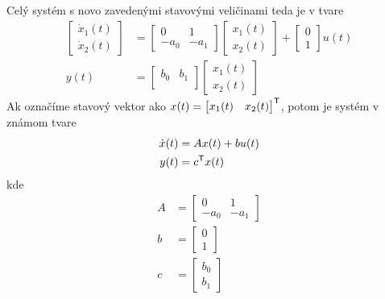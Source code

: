 \documentclass[a4paper, 10pt, ]{article}
\begin{document}
Celý systém s novo zavedenými stavovými veličinami teda je v tvare
\begin{align}
	\begin{bmatrix}
    	  \dot x_1(t) \\
		  \dot x_2(t)
 	\end{bmatrix}
	&=
	\begin{bmatrix}
    	0 & 1 \\
    	- a_0 & - a_1
  	\end{bmatrix}
    \begin{bmatrix}
    	  x_1(t) \\
		  x_2(t)
 	\end{bmatrix}
    +
    \begin{bmatrix}
    	  0 \\
		  1
 	\end{bmatrix}
    u(t)
    \\
    y(t)
    &=
    \begin{bmatrix}
        b_0 & b_1 \\
    \end{bmatrix}
    \begin{bmatrix}
          x_1(t) \\
          x_2(t)
    \end{bmatrix}
\end{align}
Ak označíme stavový vektor ako $x(t) = \begin{bmatrix} x_1(t) & x_2(t) \end{bmatrix}^{\mathsf{T}}$, potom je systém v známom tvare
\begin{subequations} \label{susDifRovnicPreODE}
    \begin{align}
    	\dot x(t) &= A x(t) + b u(t) \\
        y(t) &= c^{\mathsf{T}} x(t)
    \end{align}
\end{subequations}
kde
\begin{subequations}
\begin{align}
    A &=
    \begin{bmatrix}
    	0 & 1 \\
    	- a_0 & - a_1
  	\end{bmatrix}
    \\
    b &=
    \begin{bmatrix}
    	  0 \\
          1
 	\end{bmatrix}
    \\
    c &=
    \begin{bmatrix}
        b_0 \\ b_1 
    \end{bmatrix}
\end{align}
\end{subequations}
\end{document}
